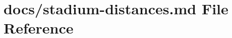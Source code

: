 \hypertarget{stadium-distances_8md}{}\section{docs/stadium-\/distances.md File Reference}
\label{stadium-distances_8md}
